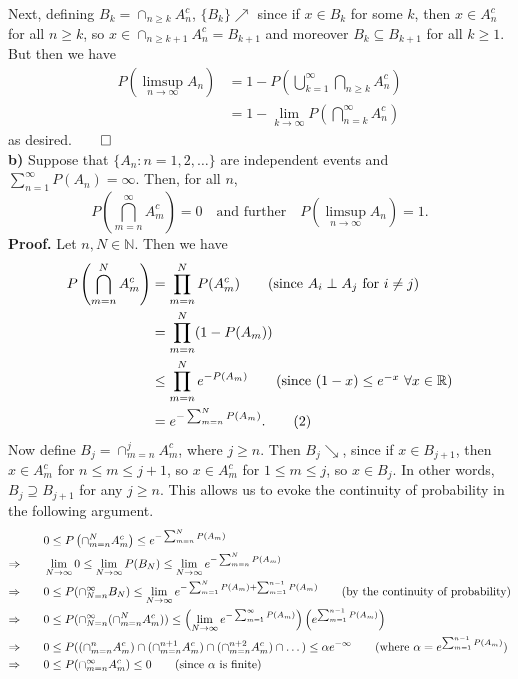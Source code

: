 \documentclass[11pt, letterpaper]{article}
\newcommand{\mbb}[1]{\mathbb{#1}}
\begin{document}
    Next, defining $B_k=\cap_{n\geq k}A_n^c$, $\{B_k\}\nearrow$ since if $x\in B_k$ for some $k$, then $x\in A_n^c$ for all $n\geq k$, so $x\in \cap_{n\geq k+1}A_n^c=B_{k+1}$ 
    and moreover $B_k\subseteq B_{k+1}$ for all $k\geq 1$. But then we have
    \begin{align*}
        P\left(\limsup_{n\rightarrow\infty}A_n\right)&=1-P\left(\bigcup_{k=1}^\infty\bigcap_{n\geq k}A_n^c\right)\\
        &=1-\lim_{k\rightarrow\infty}P\left(\bigcap_{n=k}^\infty A_n^c\right)
    \end{align*}
    as desired.\hfill{$\qed$}\\[10pt]
    {\bf b)} Suppose that $\{A_n:n=1,2,\dots\}$ are independent events and $\sum_{n=1}^\infty P(A_n)=\infty$. Then, for all $n$, 
    \[P\left(\bigcap_{m=n}^\infty A_m^c\right)=0\quad\text{and further}\quad P\left(\limsup_{n\rightarrow\infty}A_n\right)=1.\]
    {\bf Proof.} Let $n,N\in\mbb{N}$. Then we have
    \begin{align*}
        P\left(\bigcap_{m=n}^NA_m^c\right)&=\prod_{m=n}^NP(A_m^c)\tag{since $A_i\perp A_j$ for $i\neq j$}\\
        &=\prod_{m=n}^N(1-P(A_m))\\
        &\leq\prod_{m=n}^Ne^{-P(A_m)}\tag{since $(1-x)\leq e^{-x}$ $\forall x\in\mbb{R}$}\\
        &=e^{-\sum_{m=n}^NP(A_m)}.\tag{2}
    \end{align*}
    Now define $B_j=\cap_{m=n}^j A_m^c$, where $j\geq n$. Then $B_j\searrow$, since if $x\in B_{j+1}$, then $x\in A_m^c$ for $n\leq m\leq j+1$, so $x\in A_m^c$ for $1\leq m\leq j$, so $x\in B_j$.
    In other words, $B_j\supseteq B_{j+1}$ for any $j\geq n$. This allows us to evoke the continuity of probability in the following argument.
    \begin{align*}
        &0\leq P\left(\cap_{m=n}^N A_m^c\right)\leq e^{-\sum_{m=n}^NP(A_m)}\\
        \Rightarrow\qquad&\lim_{N\rightarrow\infty}0\leq\lim_{N\rightarrow\infty}P(B_N)\leq\lim_{N\rightarrow\infty}e^{-\sum_{m=n}^NP(A_m)}\\
        \Rightarrow\qquad&0\leq P(\cap_{N=n}^\infty B_N)\leq \lim_{N\rightarrow\infty}e^{-\sum_{m=1}^NP(A_m)+\sum_{m=1}^{n-1}P(A_m)}\tag{by the continuity of probability}\\
        \Rightarrow\qquad&0\leq P(\cap_{N=n}^\infty (\cap_{m=n}^NA_m^c))\leq\left(\lim_{N\rightarrow\infty}e^{-\sum_{m=1}^\infty P(A_m)}\right)\left(e^{\sum_{m=1}^{n-1}P(A_m)}\right)\\
        \Rightarrow\qquad&0\leq P((\cap_{m=n}^n A_m^c)\cap(\cap_{m=n}^{n+1}A_m^c)\cap(\cap_{m=n}^{n+2}A_m^c)\cap\dots)\leq \alpha e^{-\infty}\tag{where $\alpha=e^{\sum_{m=1}^{n-1}P(A_m)}$}\\
        \Rightarrow\qquad&0\leq P(\cap_{m=n}^\infty A_m^c)\leq 0\tag{since $\alpha$ is finite}
    \end{align*}
\end{document}
